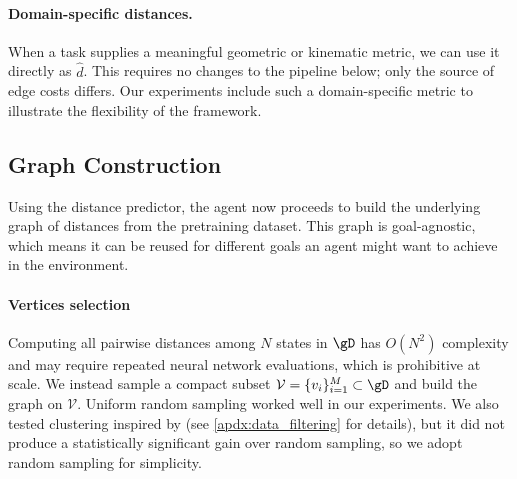 \documentclass{article} %
\begin{document}
\paragraph{Domain-specific distances.}
When a task supplies a meaningful geometric or kinematic metric, we can use it directly as $\hat d$. This requires no changes to the pipeline below; only the source of edge costs differs. Our experiments include such a domain-specific metric to illustrate the flexibility of the framework.


\subsection{Graph Construction}\label{subsec:graph} 
Using the distance predictor, the agent now proceeds to build the underlying graph of distances from the pretraining dataset.
This graph is goal-agnostic, which means it can be reused for different goals an agent might want to achieve in the environment.

\paragraph{Vertices selection}
Computing all pairwise distances among $N$ states in $\gD$ has $O(N^2)$ complexity and may require repeated neural network evaluations, which is prohibitive at scale. We instead sample a compact subset $\mathcal{V}=\{v_i\}_{i=1}^M\subset\gD$ and build the graph on $\mathcal{V}$. Uniform random sampling worked well in our experiments. We also tested clustering inspired by \citet{gas_baek2025} (see \autoref{apdx:data_filtering} for details), but it did not produce a statistically significant gain over random sampling, so we adopt random sampling for simplicity.
\end{document}
